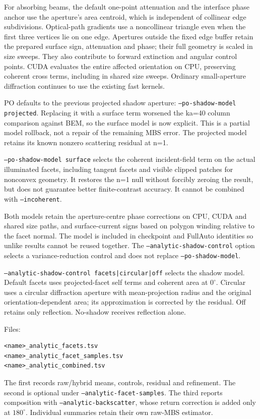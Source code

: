 \documentclass[
  10pt,
  a4paper,
]{article}
\begin{document}
For absorbing beams, the default one-point attenuation and the interface phase
anchor use the aperture's area centroid, which is independent of collinear edge
subdivisions. Optical-path gradients use a noncollinear triangle even when the
first three vertices lie on one edge. Apertures outside the fixed edge buffer
retain the prepared surface sign, attenuation and phase; their full geometry is
scaled in size sweeps. They also contribute to forward extinction and angular
control points. CUDA evaluates the entire affected orientation on CPU, preserving
coherent cross terms, including in shared size sweeps. Ordinary small-aperture
diffraction continues to use the existing fast kernels.

PO defaults to the previous projected shadow aperture:
\texttt{--po-shadow-model projected}. Replacing it with a surface term worsened the
ka=40 column comparison against BEM, so the surface model is now explicit.
This is a partial model rollback, not a repair of the remaining MBS error.
The projected model retains its known nonzero scattering residual at n=1.

\texttt{--po-shadow-model surface} selects the coherent incident-field term on the
actual illuminated facets, including tangent facets and visible clipped patches
for nonconvex geometry. It restores the n=1 null without forcibly zeroing the
result, but does not guarantee better finite-contrast accuracy. It cannot be
combined with \texttt{--incoherent}.

Both models retain the aperture-centre phase corrections on CPU, CUDA and
shared size paths, and surface-current signs based on polygon winding relative
to the facet normal. The model is included in checkpoint and FullAuto identities
so unlike results cannot be reused together. The \texttt{--analytic-shadow-control}
option selects a variance-reduction control and does not replace \texttt{--po-shadow-model}.

\texttt{--analytic-shadow-control facets|circular|off} selects the shadow model.
Default facets uses projected-facet self terms and coherent area at $0^\circ$.
Circular uses a circular diffraction aperture with mean-projection radius and
the original orientation-dependent area; its approximation is corrected by
the residual. Off retains only reflection. No-shadow receives reflection alone.

Files:
\begin{verbatim}
<name>_analytic_facets.tsv
<name>_analytic_facet_samples.tsv
<name>_analytic_combined.tsv
\end{verbatim}
The first records raw/hybrid means, controls, residual and refinement.
The second is optional under \texttt{--analytic-facet-samples}. The third reports
composition with \texttt{--analytic-backscatter}, whose return correction is
added only at $180^\circ$. Individual summaries retain their own raw-MBS estimator.
\end{document}
